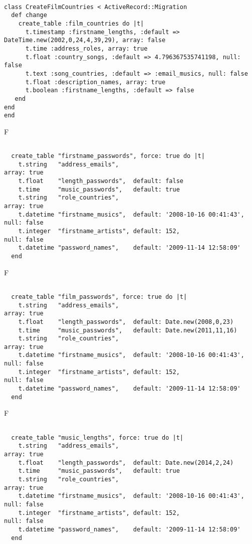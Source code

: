 \begin{verbatim}

class CreateFilmCountries < ActiveRecord::Migration 
  def change 
    create_table :film_countries do |t| 
      t.timestamp :firstname_lengths, :default => DateTime.new(2002,0,24,4,39,29), array: false
      t.time :address_roles, array: true
      t.float :country_songs, :default => 4.796367535741198, null: false
      t.text :song_countries, :default => :email_musics, null: false
      t.float :description_names, array: true
      t.boolean :firstname_lengths, :default => false
   end
end
end
\end{verbatim}

F
\begin{verbatim}

  create_table "firstname_passwords", force: true do |t|
    t.string   "address_emails",                                                 array: true
    t.float    "length_passwords",  default: false
    t.time     "music_passwords",   default: true
    t.string   "role_countries",                                                 array: true
    t.datetime "firstname_musics",  default: '2008-10-16 00:41:43', null: false
    t.integer  "firstname_artists", default: 152,                   null: false
    t.datetime "password_names",    default: '2009-11-14 12:58:09'
  end

\end{verbatim}

F
\begin{verbatim}

  create_table "film_passwords", force: true do |t|
    t.string   "address_emails",                                                 array: true
    t.float    "length_passwords",  default: Date.new(2008,0,23)
    t.time     "music_passwords",   default: Date.new(2011,11,16)
    t.string   "role_countries",                                                 array: true
    t.datetime "firstname_musics",  default: '2008-10-16 00:41:43', null: false
    t.integer  "firstname_artists", default: 152,                   null: false
    t.datetime "password_names",    default: '2009-11-14 12:58:09'
  end

\end{verbatim}

F
\begin{verbatim}

  create_table "music_lengths", force: true do |t|
    t.string   "address_emails",                                                 array: true
    t.float    "length_passwords",  default: Date.new(2014,2,24)
    t.time     "music_passwords",   default: true
    t.string   "role_countries",                                                 array: true
    t.datetime "firstname_musics",  default: '2008-10-16 00:41:43', null: false
    t.integer  "firstname_artists", default: 152,                   null: false
    t.datetime "password_names",    default: '2009-11-14 12:58:09'
  end

\end{verbatim}

